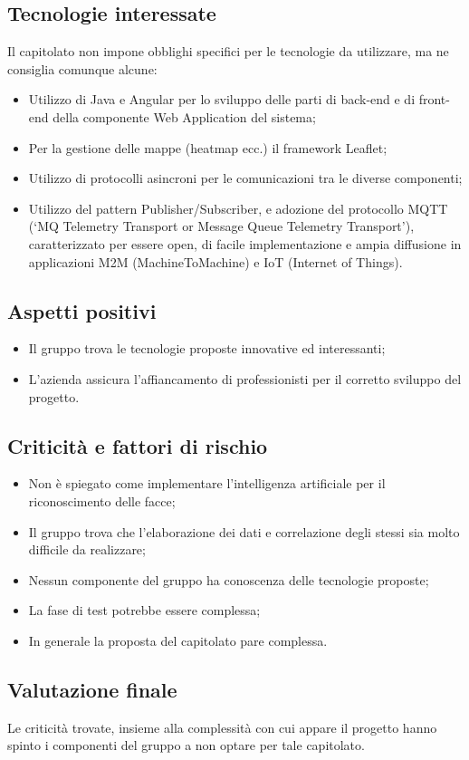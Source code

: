 \subsection{Tecnologie interessate}
Il capitolato non impone obblighi specifici per le tecnologie da utilizzare, ma ne consiglia comunque alcune:
\begin{itemize}
\item Utilizzo di Java e Angular per lo sviluppo delle parti di back-end e di front-end della componente Web
Application del sistema;
\item Per la gestione delle mappe (heatmap ecc.) il framework Leaflet;
\item Utilizzo di protocolli asincroni per le comunicazioni tra le diverse componenti;
\item Utilizzo del pattern Publisher/Subscriber, e adozione del protocollo MQTT (‘MQ Telemetry Transport
or Message Queue Telemetry Transport’), caratterizzato per essere open, di facile implementazione
e ampia diffusione in applicazioni M2M (MachineToMachine) e IoT (Internet of Things).
\end{itemize}

\subsection{Aspetti positivi}
\begin{itemize}
\item Il gruppo trova le tecnologie proposte innovative ed interessanti;
\item L'azienda assicura l'affiancamento di professionisti per il corretto sviluppo del progetto.
\end{itemize}

\subsection{Criticità e fattori di rischio}
\begin{itemize}
\item Non è spiegato come implementare l'intelligenza artificiale per il riconoscimento delle facce;
\item Il gruppo trova che l'elaborazione dei dati e correlazione degli stessi sia molto difficile da realizzare;
\item Nessun componente del gruppo ha conoscenza delle tecnologie proposte;
\item La fase di test potrebbe essere complessa;
\item In generale la proposta del capitolato pare complessa.
\end{itemize}

\subsection{Valutazione finale}
Le criticità trovate, insieme alla complessità con cui appare il progetto hanno spinto i componenti del gruppo a non optare per tale capitolato.
